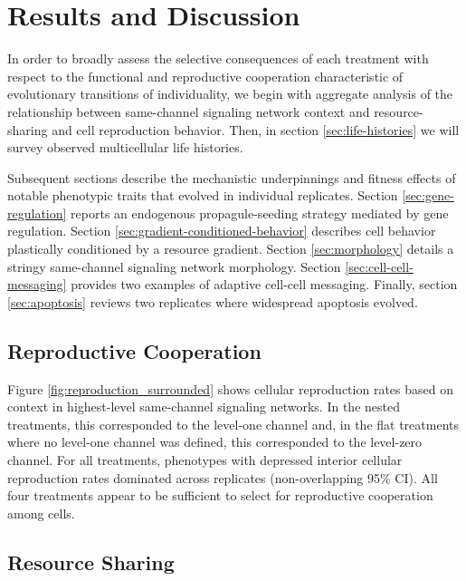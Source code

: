 \section{Results and Discussion}

In order to broadly assess the selective consequences of each treatment with respect to the functional and reproductive cooperation characteristic of evolutionary transitions of individuality, we begin with aggregate analysis of the relationship between same-channel signaling network context and resource-sharing and cell reproduction behavior.
Then, in section \ref{sec:life-histories} we will survey observed multicellular life histories.

Subsequent sections describe the mechanistic underpinnings and fitness effects of notable phenotypic traits that evolved in individual replicates.
Section \ref{sec:gene-regulation} reports an endogenous propagule-seeding strategy mediated by gene regulation.
Section \ref{sec:gradient-conditioned-behavior} describes cell behavior plastically conditioned by a resource gradient.
Section \ref{sec:morphology} details a stringy same-channel signaling network morphology.
Section \ref{sec:cell-cell-messaging} provides two examples of adaptive cell-cell messaging.
Finally, section \ref{sec:apoptosis} reviews two replicates where widespread apoptosis evolved.

\subsection{Reproductive Cooperation} \label{sec:reproductive-cooperation}



Figure \ref{fig:reproduction_surrounded} shows cellular reproduction rates based on context in highest-level same-channel signaling networks.
In the nested treatments, this corresponded to the level-one channel and, in the flat treatments where no level-one channel was defined, this corresponded to the level-zero channel.
For all treatments, phenotypes with depressed interior cellular reproduction rates dominated across replicates (non-overlapping 95\% CI).
All four treatments appear to be sufficient to select for reproductive cooperation among cells.

\subsection{Resource Sharing} \label{sec:resource-sharing}

